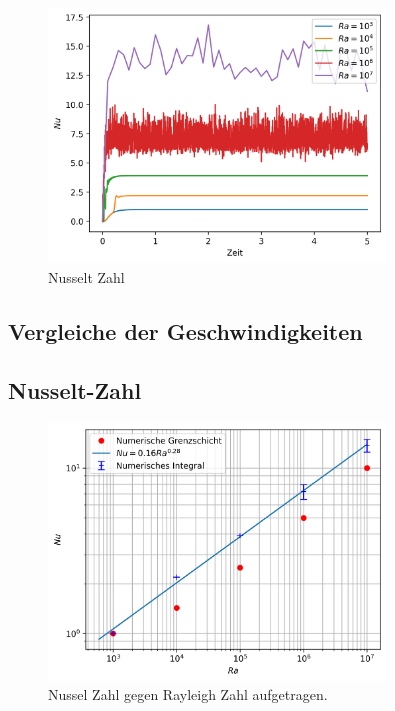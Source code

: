 \documentclass[12pt,a4paper,titlepage,headinclude]{scrartcl}
\numberwithin{equation}{subsection}
\begin{document}
\begin{figure}[!ht]
\centering
\includegraphics[width=0.8\textwidth]{Nu.png}
\caption{Nusselt Zahl}
\label{fig:nu_num}
\end{figure}





\subsection{Vergleiche der Geschwindigkeiten}

\subsection{Nusselt-Zahl}

\begin{figure}[!ht]
\centering
\includegraphics[width=0.8\textwidth]{Nu_Ra.png}
\caption{Nussel Zahl gegen Rayleigh Zahl aufgetragen.}
\label{fig:Nu_Ra}
\end{figure}
\end{document}
